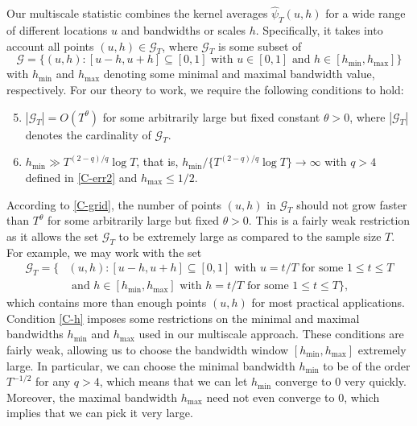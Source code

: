 \documentclass[a4paper,12pt]{article}
\numberwithin{equation}{section}
\begin{document}
Our multiscale statistic combines the kernel averages $\widehat{\psi}_T(u,h)$ for a wide range of different locations $u$ and bandwidths or scales $h$. Specifically, it takes into account all points $(u,h) \in \mathcal{G}_T$, where $\mathcal{G}_T$ is some subset of 
\[ \mathcal{G} =  \big\{ (u,h): [u-h,u+h] \subseteq [0,1] \text{ with } u \in [0,1] \text{ and } h \in [h_{\min},h_{\max}] \big\} \]
with $h_{\min}$ and $h_{\max}$ denoting some minimal and maximal bandwidth value, respectively. For our theory to work, we require the following conditions to hold:
\begin{enumerate}[label=(C\arabic*),leftmargin=1.05cm]
\setcounter{enumi}{4}

\item \label{C-grid} $|\mathcal{G}_T| = O(T^\theta)$ for some arbitrarily large but fixed constant $\theta > 0$, where $|\mathcal{G}_T|$ denotes the cardinality of $\mathcal{G}_T$. 

\item \label{C-h} $h_{\min} \gg T^{(2-q)/q} \log T$, that is, $h_{\min} / \{ T^{(2-q)/q} \log T \} \rightarrow \infty$ with $q > 4$ defined in \ref{C-err2} and $h_{\max} \le 1/2$.

\end{enumerate}
According to \ref{C-grid}, the number of points $(u,h)$ in $\mathcal{G}_T$ should not grow faster than $T^\theta$ for some arbitrarily large but fixed $\theta > 0$. This is a fairly weak restriction as it allows the set $\mathcal{G}_T$ to be extremely large as compared to the sample size $T$. For example, we may work with the set 
\begin{align*}
\mathcal{G}_T = \big\{ & (u,h): [u-h,u+h] \subseteq [0,1] \text{ with } u = t/T \text{ for some } 1 \le t \le T \\ & \text{ and } h \in [h_{\min},h_{\max}] \text{ with } h = t/T \text{ for some } 1 \le t \le T  \big\},
\end{align*}
which contains more than enough points $(u,h)$ for most practical applications. Condition \ref{C-h} imposes some restrictions on the minimal and maximal bandwidths $h_{\min}$ and $h_{\max}$ used in our multiscale approach. These conditions are fairly weak, allowing us to choose the bandwidth window $[h_{\min},h_{\max}]$ extremely large. In particular, we can choose the minimal bandwidth $h_{\min}$ to be of the order $T^{-1/2}$ for any $q > 4$, which means that we can let $h_{\min}$ converge to $0$ very quickly. Moreover, the maximal bandwidth $h_{\max}$ need not even converge to $0$, which implies that we can pick it very large.
\end{document}
